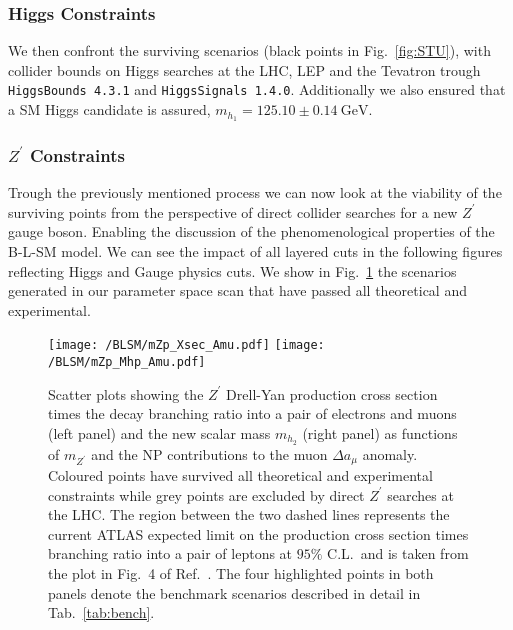 
\subsubsection{Higgs Constraints}

We then confront the surviving scenarios (black points in Fig.~\ref{fig:STU}), with collider bounds on Higgs searches at the LHC, LEP and the Tevatron trough \texttt{HiggsBounds 4.3.1} and \texttt{HiggsSignals 1.4.0}. 
%
Additionally we also ensured that a SM Higgs candidate is assured, $m_{h_1} = 125.10 \pm 0.14~\textrm{GeV}$. 



\subsubsection{$Z^\prime$ Constraints}

Trough the previously mentioned process we can now look at the viability of the surviving points from the perspective of direct collider searches for a new $Z^\prime$ gauge boson. Enabling the discussion of the phenomenological properties of the B-L-SM model. We can see the impact of all layered cuts in the following figures reflecting Higgs and Gauge physics cuts. We show in Fig.~\ref{fig:Plots1} the scenarios generated in our parameter space scan that have passed all theoretical and experimental.
%
\begin{figure}[H]
	\centering
	\texttt{[image: /BLSM/mZp\_Xsec\_Amu.pdf]}
	\texttt{[image: /BLSM/mZp\_Mhp\_Amu.pdf]}
	\caption{Scatter plots showing the $Z^\prime$ Drell-Yan production cross section times the decay branching ratio into a pair of electrons and muons (left panel) and the new scalar mass $m_{h_2}$ (right panel) as functions of $m_{Z^\prime}$ and the NP contributions to the muon $\Delta a_\mu$ anomaly. Coloured points have survived all theoretical and experimental constraints while grey points are excluded by direct $Z^\prime$ searches at the LHC. The region between the two dashed lines represents the current ATLAS expected limit on the production cross section times branching ratio into a pair of leptons at $95\%$ C.L.~and is taken from the plot in Fig.~4 of Ref.~\cite{Aaboud:2017buh}. The four highlighted points in both panels denote the benchmark scenarios described in detail in Tab.~\ref{tab:bench}.}
	\label{fig:Plots1}
\end{figure}	

